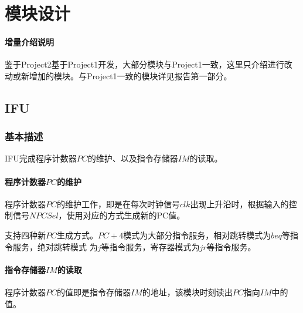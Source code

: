 \documentclass[main.tex]{subfiles}
\begin{document}
\section{模块设计}

\paragraph{增量介绍说明}
鉴于Project2基于Project1开发，大部分模块与Project1一致，这里只介绍进行改动或新增加的模块。与Project1一致的模块详见报告第一部分。

\subsection{IFU}
\subsubsection{基本描述}
IFU完成程序计数器$PC$的维护、以及指令存储器$IM$的读取。
\paragraph{程序计数器$PC$的维护}
程序计数器$PC$的维护工作，即是在每次时钟信号$clk$出现上升沿时，根据输入的控制信号$NPCSel$，使用对应的方式生成新的PC值。

支持四种新$PC$生成方式。$PC+4$模式为大部分指令服务，相对跳转模式为$beq$等指令服务，绝对跳转模式 为$j$等指令服务，寄存器模式为$jr$等指令服务。

\paragraph{指令存储器$IM$的读取}
程序计数器$PC$的值即是指令存储器$IM$的地址，该模块时刻读出$PC$指向$IM$中的值。
\end{document}
